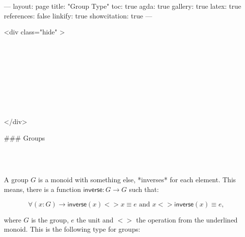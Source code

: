 ---
layout: page
title: "Group Type"
toc: true
agda: true
gallery: true
latex: true
references: false
linkify: true
showcitation: true
---

<div class="hide" >
\begin{code}%
\>[0]\AgdaSymbol{\{-\#}\AgdaSpace{}%
\AgdaSpace{}%
\AgdaSpace{}%
\AgdaSymbol{\#-\}}\<%
\\
\>[0]\AgdaSpace{}%
\AgdaSpace{}%
\<%
\\
\>[0]\AgdaSpace{}%
\AgdaSpace{}%
\<%
\\
%
\\[\AgdaEmptyExtraSkip]%
\>[0]\AgdaSpace{}%
\AgdaSpace{}%
\<%
\\
\>[0]\AgdaSpace{}%
\AgdaSpace{}%
\<%
\\
\>[0]\AgdaSpace{}%
\AgdaSpace{}%
\<%
\\
\>[0]\AgdaSpace{}%
\AgdaSpace{}%
\<%
\end{code}
</div>

### Groups

\begin{code}%
\>[0]\<%
\\
\>[0][@{}l@{\AgdaIndent{0}}]%
\>[2]\<%
\\
\>[2][@{}l@{\AgdaIndent{0}}]%
\>[4]\<%
\end{code}

A group $G$ is a monoid with something else, *inverses* for each element.
This means, there is a function $\mathsf{inverse} : G → G$ such that:

$$∀ (x : G) → \mathsf{inverse}(x) <> x ≡ e\text {  and  }x <>
\mathsf{inverse}(x)  ≡ e,$$

where $G$ is the group, $e$ the unit and $<>$ the operation from the underlined
monoid. This is the following type for groups:


